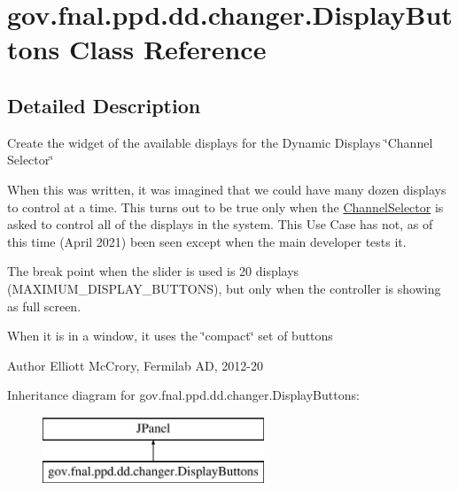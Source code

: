 \hypertarget{classgov_1_1fnal_1_1ppd_1_1dd_1_1changer_1_1DisplayButtons}{\section{gov.\-fnal.\-ppd.\-dd.\-changer.\-Display\-Buttons Class Reference}
\label{classgov_1_1fnal_1_1ppd_1_1dd_1_1changer_1_1DisplayButtons}
}


\subsection{Detailed Description}
Create the widget of the available displays for the Dynamic Displays \char`\"{}\-Channel Selector\char`\"{}

When this was written, it was imagined that we could have many dozen displays to control at a time. This turns out to be true only when the \hyperlink{classgov_1_1fnal_1_1ppd_1_1dd_1_1ChannelSelector}{Channel\-Selector} is asked to control all of the displays in the system. This Use Case has not, as of this time (April 2021) been seen except when the main developer tests it.

The break point when the slider is used is 20 displays (M\-A\-X\-I\-M\-U\-M\-\_\-\-D\-I\-S\-P\-L\-A\-Y\-\_\-\-B\-U\-T\-T\-O\-N\-S), but only when the controller is showing as full screen.

When it is in a window, it uses the \char`\"{}compact\char`\"{} set of buttons

\begin{DoxyAuthor}{Author}
Elliott Mc\-Crory, Fermilab A\-D, 2012-\/20 
\end{DoxyAuthor}
Inheritance diagram for gov.\-fnal.\-ppd.\-dd.\-changer.\-Display\-Buttons\-:\begin{figure}[H]
\begin{center}
\leavevmode
\includegraphics[height=2.000000cm]{classgov_1_1fnal_1_1ppd_1_1dd_1_1changer_1_1DisplayButtons}
\end{center}
\end{figure}

